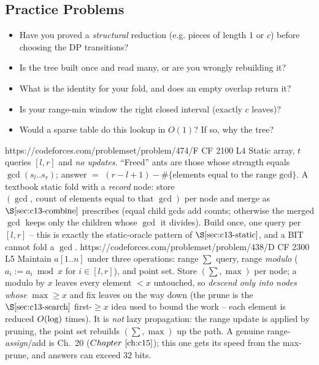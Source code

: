 \subsection{Practice Problems}

\begin{stuckbox}
\begin{itemize}[nosep,leftmargin=1.4em]
  \item Have you proved a \emph{structural} reduction (e.g. pieces of length \(1\)
        or \(c\)) before choosing the DP transitions?
  \item Is the tree built once and read many, or are you wrongly rebuilding it?
  \item What is the identity for your fold, and does an empty overlap return it?
  \item Is your range-min window the right closed interval (exactly \(c\) leaves)?
  \item Would a sparse table do this lookup in \(O(1)\)?  If so, why the tree?
\end{itemize}
\end{stuckbox}

\begin{practiceset}
    {https://codeforces.com/problemset/problem/474/F}
    {CF 2100 L4}
    {Static array, \(t\) queries \([l,r]\) and \emph{no updates}.  ``Freed'' ants
     are those whose strength equals \(\gcd(s_l..s_r)\); answer \(=\) \((r{-}l{+}1)
     - \#\{\text{elements equal to the range gcd}\}\).  A textbook static fold with a
     \emph{record} node: store \((\gcd,\ \text{count of elements equal to that } \gcd)\)
     per node and merge as \(\secref{c13-combine}\) prescribes (equal child gcds add
     counts; otherwise the merged \(\gcd\) keeps only the children whose \(\gcd\) it
     divides).  Build once, one query per \([l,r]\) -- this is exactly the
     static-oracle pattern of \(\secref{c13-static}\), and a BIT cannot fold a
     \(\gcd\).}
    {https://codeforces.com/problemset/problem/438/D}
    {CF 2300 L5}
    {Maintain \(a[1..n]\) under three operations: range \(\sum\) query, range
     \emph{modulo} (\(a_i := a_i \bmod x\) for \(i\in[l,r]\)), and point set.
     Store \((\sum,\max)\) per node; a modulo by \(x\) leaves every element
     \(<x\) untouched, so \emph{descend only into nodes whose } \(\max\ge x\) and
     fix leaves on the way down (the prune is the \(\secref{c13-search}\) first-\(\ge
     x\) idea used to bound the work -- each element is reduced \(O(\log)\)
     times).  It is \emph{not} lazy propagation: the range update is applied by
     pruning, the point set rebuilds \((\sum,\max)\) up the path.  A genuine
     range-\emph{assign}/add is Ch.~20 (\(\chref{c15}\)); this one gets its speed
     from the max-prune, and answers can exceed \(32\) bits.}
\end{practiceset}


